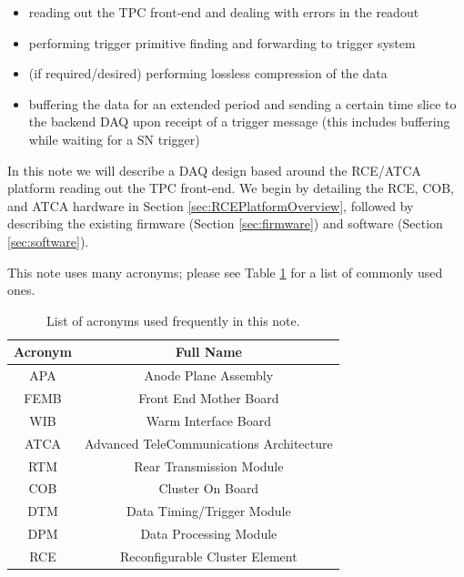 \begin{itemize}
\item  reading out the TPC front-end and dealing with errors in the readout
\item  performing trigger primitive finding and forwarding to trigger system
\item (if required/desired) performing lossless compression of the data
\item buffering the data for an extended period and sending a certain time slice to the backend DAQ upon receipt of a trigger message (this includes buffering while waiting for a SN trigger)
\end{itemize}

In this note we will describe a DAQ design based around the RCE/ATCA platform reading out the TPC front-end.  We begin by detailing the RCE, COB, and ATCA hardware in Section \ref{sec:RCEPlatformOverview}, followed by describing the existing firmware (Section \ref{sec:firmware}) and software (Section \ref{sec:software}).  

This note uses many acronyms; please see Table \ref{tab:acronym} for a list of commonly used ones.  

\begin{table}[htp]
\begin{center}
\begin{tabular}{|c|c|}
\hline
Acronym  &  Full Name \\
\hline
\hline
APA  & Anode Plane Assembly\\
\hline
FEMB  & Front End Mother Board\\
\hline
WIB  &  Warm Interface Board  \\
\hline
ATCA  &  Advanced TeleCommunications Architecture\\
\hline
RTM  & Rear Transmission Module  \\
\hline
COB  &  Cluster On Board  \\
\hline
DTM  &  Data Timing/Trigger Module  \\
\hline
DPM  &  Data Processing Module  \\
\hline
RCE  &  Reconfigurable Cluster Element\\
\hline
\end{tabular}
\end{center}
\caption{List of acronyms used frequently in this note.  }
\label{tab:acronym}
\end{table}%


